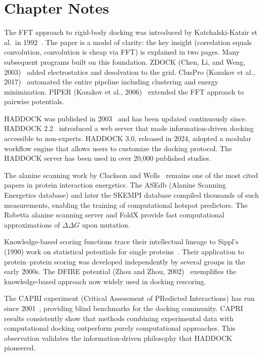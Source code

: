 \section{Chapter Notes}
\label{sec:docking-notes}

The FFT approach to rigid-body docking was introduced by Katchalski-Katzir et al.\ in 1992~\cite{katchalskikatzir1992}.
The paper is a model of clarity: the key insight (correlation equals convolution, convolution is cheap via FFT) is explained in two pages.
Many subsequent programs built on this foundation.
ZDOCK (Chen, Li, and Weng, 2003)~\cite{chen2003zdock} added electrostatics and desolvation to the grid.
ClusPro (Kozakov et al., 2017)~\cite{kozakov2017cluspro} automated the entire pipeline including clustering and energy minimization.
PIPER (Kozakov et al., 2006)~\cite{kozakov2006piper} extended the FFT approach to pairwise potentials.

HADDOCK was published in 2003~\cite{dominguez2003} and has been updated continuously since.
HADDOCK 2.2~\cite{vanzundert2016} introduced a web server that made information-driven docking accessible to non-experts.
HADDOCK 3.0, released in 2024, adopted a modular workflow engine that allows users to customize the docking protocol.
The HADDOCK server has been used in over 20,000 published studies.

The alanine scanning work by Clackson and Wells~\cite{clackson1995} remains one of the most cited papers in protein interaction energetics.
The ASEdb (Alanine Scanning Energetics database) and later the SKEMPI database compiled thousands of such measurements, enabling the training of computational hotspot predictors.
The Robetta alanine scanning server and FoldX provide fast computational approximations of $\Delta\Delta G$ upon mutation.

Knowledge-based scoring functions trace their intellectual lineage to Sippl's (1990) work on statistical potentials for single proteins~\cite{sippl1990}.
Their application to protein--protein scoring was developed independently by several groups in the early 2000s.
The DFIRE potential (Zhou and Zhou, 2002)~\cite{zhou2002dfire} exemplifies the knowledge-based approach now widely used in docking rescoring.

The CAPRI experiment (Critical Assessment of PRedicted Interactions) has run since 2001~\cite{janin2003capri}, providing blind benchmarks for the docking community.
CAPRI results consistently show that methods combining experimental data with computational docking outperform purely computational approaches.
This observation validates the information-driven philosophy that HADDOCK pioneered.

